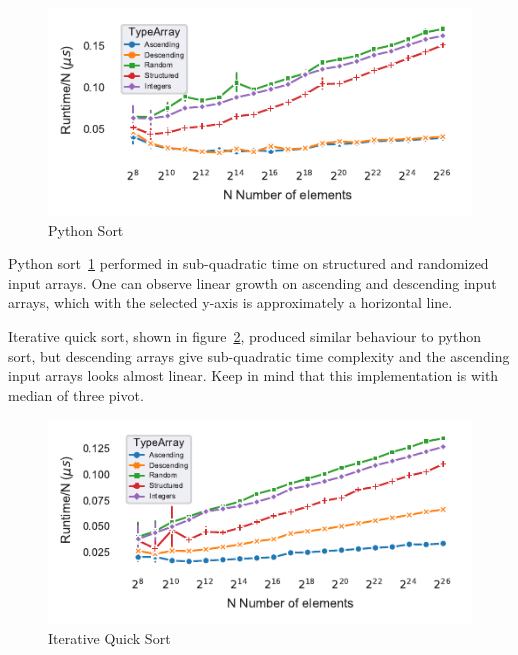 \documentclass[sigconf, nonacm, natbib, screen, balance=False]{acmart}
\begin{document}
\begin{figure}[]
  \centering
  \includegraphics[scale=0.75]{time_per_npython_sort.pdf}
  \caption{Python Sort}
  \label{fig:time_per_npython_sort}
\end{figure}

Python sort~\ref{fig:time_per_npython_sort} performed in sub-quadratic time on structured and randomized input arrays. One can observe linear growth on ascending and descending input arrays, which with the selected y-axis is approximately a horizontal line.

Iterative quick sort, shown in figure~\ref{fig:time_per_niterative_quicksort}, produced similar behaviour to python sort, but descending arrays give sub-quadratic time complexity and the ascending input arrays looks almost linear. Keep in mind that this implementation is with median of three pivot.

\begin{figure}[]
  \centering
  \includegraphics[scale=0.75]{time_per_niterative_quicksort.pdf}
  \caption{Iterative Quick Sort}
  \label{fig:time_per_niterative_quicksort}
\end{figure}
\end{document}
